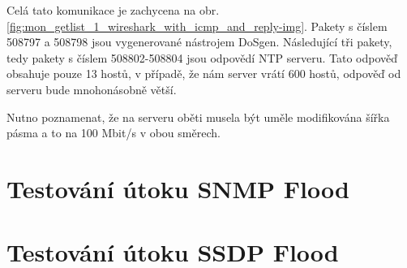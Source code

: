 Celá tato komunikace je zachycena na obr. \ref{fig:mon_getlist_1_wireshark_with_icmp_and_reply-img}. Pakety s číslem 508797 a 508798 jsou vygenerované nástrojem DoSgen. Následující tři pakety, tedy pakety s číslem 508802-508804 jsou odpovědí NTP serveru. Tato odpověď obsahuje pouze 13 hostů, v případě, že nám server vrátí 600 hostů, odpověď od serveru bude mnohonásobně větší.

Nutno poznamenat, že na serveru oběti musela být uměle modifikována šířka pásma a to na 100 Mbit/s v obou směrech.

\section{Testování útoku SNMP Flood}



\section{Testování útoku SSDP Flood}


